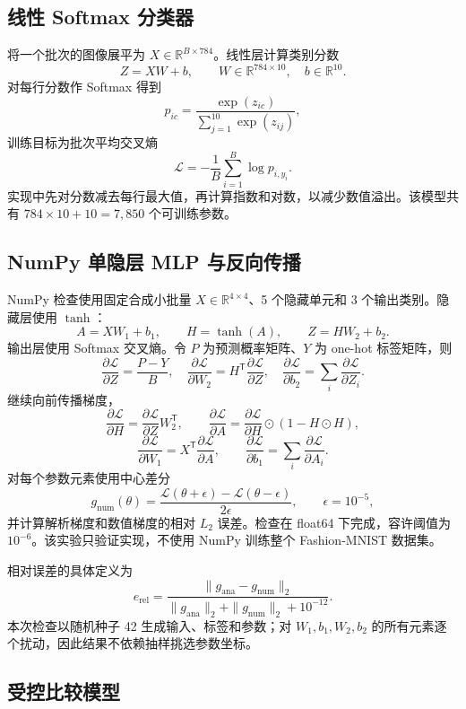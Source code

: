 \documentclass[dvipsnames,svgnames,a4paper,11pt]{article}
\begin{document}
\subsection{线性 Softmax 分类器}

将一个批次的图像展平为 $X\in\mathbb{R}^{B\times784}$。线性层计算类别分数
\[
  Z=XW+b,\qquad W\in\mathbb{R}^{784\times10},\quad b\in\mathbb{R}^{10}.
\]
对每行分数作 Softmax 得到
\[
  p_{ic}=\frac{\exp(z_{ic})}{\sum_{j=1}^{10}\exp(z_{ij})},
\]
训练目标为批次平均交叉熵
\[
  \mathcal{L}=-\frac{1}{B}\sum_{i=1}^{B}\log p_{i,y_i}.
\]
实现中先对分数减去每行最大值，再计算指数和对数，以减少数值溢出。该模型共有 $784\times10+10=7,850$ 个可训练参数。

\subsection{NumPy 单隐层 MLP 与反向传播}

NumPy 检查使用固定合成小批量 $X\in\mathbb{R}^{4\times4}$、5 个隐藏单元和 3 个输出类别。隐藏层使用 $\tanh$：
\[
 A=XW_1+b_1,\qquad H=\tanh(A),\qquad Z=HW_2+b_2.
\]
输出层使用 Softmax 交叉熵。令 $P$ 为预测概率矩阵、$Y$ 为 one-hot 标签矩阵，则
\[
 \frac{\partial\mathcal{L}}{\partial Z}=\frac{P-Y}{B},\quad
 \frac{\partial\mathcal{L}}{\partial W_2}=H^\mathsf{T}\frac{\partial\mathcal{L}}{\partial Z},\quad
 \frac{\partial\mathcal{L}}{\partial b_2}=\sum_i\frac{\partial\mathcal{L}}{\partial Z_i}.
\]
继续向前传播梯度，
\[
 \frac{\partial\mathcal{L}}{\partial H}=\frac{\partial\mathcal{L}}{\partial Z}W_2^\mathsf{T},\qquad
 \frac{\partial\mathcal{L}}{\partial A}
 =\frac{\partial\mathcal{L}}{\partial H}\odot(1-H\odot H),
\]
\[
 \frac{\partial\mathcal{L}}{\partial W_1}=X^\mathsf{T}\frac{\partial\mathcal{L}}{\partial A},\qquad
 \frac{\partial\mathcal{L}}{\partial b_1}=\sum_i\frac{\partial\mathcal{L}}{\partial A_i}.
\]
对每个参数元素使用中心差分
\[
 g_{\mathrm{num}}(\theta)=
 \frac{\mathcal{L}(\theta+\epsilon)-\mathcal{L}(\theta-\epsilon)}{2\epsilon},
 \qquad \epsilon=10^{-5},
\]
并计算解析梯度和数值梯度的相对 $L_2$ 误差。检查在 float64 下完成，容许阈值为 $10^{-6}$。该实验只验证实现，不使用 NumPy 训练整个 Fashion-MNIST 数据集。

相对误差的具体定义为
\[
  e_{\mathrm{rel}}=\frac{\|g_{\mathrm{ana}}-g_{\mathrm{num}}\|_2}
  {\|g_{\mathrm{ana}}\|_2+\|g_{\mathrm{num}}\|_2+10^{-12}}.
\]
本次检查以随机种子 42 生成输入、标签和参数；对 $W_1,b_1,W_2,b_2$ 的所有元素逐个扰动，因此结果不依赖抽样挑选参数坐标。

\subsection{受控比较模型}
\end{document}
